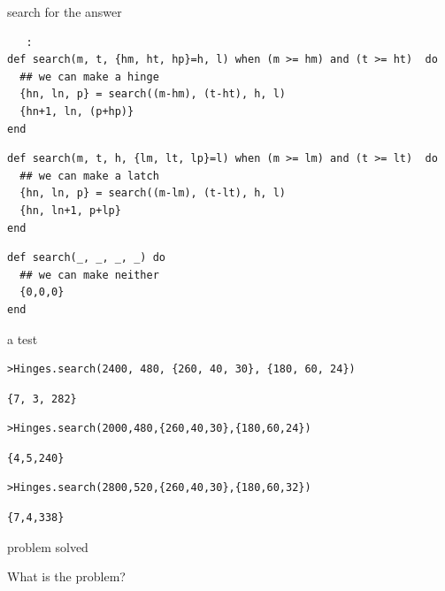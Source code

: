 \begin{frame}[fragile]{search for the answer}

\begin{verbatim}
   :
def search(m, t, {hm, ht, hp}=h, l) when (m >= hm) and (t >= ht)  do
  ## we can make a hinge
  {hn, ln, p} = search((m-hm), (t-ht), h, l)
  {hn+1, ln, (p+hp)}
end
\end{verbatim}\pause
\begin{verbatim}
def search(m, t, h, {lm, lt, lp}=l) when (m >= lm) and (t >= lt)  do
  ## we can make a latch
  {hn, ln, p} = search((m-lm), (t-lt), h, l)
  {hn, ln+1, p+lp}
end
\end{verbatim}\pause
\begin{verbatim}
def search(_, _, _, _) do
  ## we can make neither
  {0,0,0}
end
\end{verbatim}
\end{frame}


\begin{frame}[fragile]{a test}

\begin{verbatim}
>Hinges.search(2400, 480, {260, 40, 30}, {180, 60, 24})
\end{verbatim}
\pause
\begin{verbatim}
{7, 3, 282}
\end{verbatim}
\pause
\begin{verbatim}
>Hinges.search(2000,480,{260,40,30},{180,60,24})
\end{verbatim}
\pause
\begin{verbatim}
{4,5,240}
\end{verbatim}
\begin{verbatim}
>Hinges.search(2800,520,{260,40,30},{180,60,32})
\end{verbatim}
\pause
\begin{verbatim}
{7,4,338}
\end{verbatim}

\end{frame}

\begin{frame}{problem solved}

\pause
\vspace{40pt}\hspace{140pt}What is the problem?

\end{frame}

